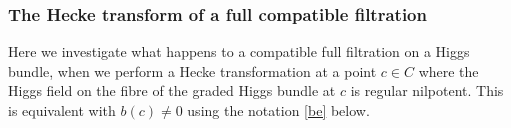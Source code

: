 \documentclass[12pt]{article}
\numberwithin{equation}{section}
\theoremstyle{remark}
\theoremstyle{definition}
\numberwithin{theorem}{section}
\def\bes{\begin{eqnarray*}}
\def\ees{\end{eqnarray*}}
\renewcommand{\1}{\mathbbm{1}}
\begin{document}


\subsubsection{The Hecke transform of a full compatible filtration}

Here we investigate what happens to a compatible full filtration on a Higgs bundle,  when we perform a Hecke transformation at a point $c\in C$ where the Higgs field on the fibre of the graded Higgs bundle at $c$ is regular nilpotent. This is equivalent with $b(c)\neq 0$ using the notation \eqref{be} below. 
\end{document}
